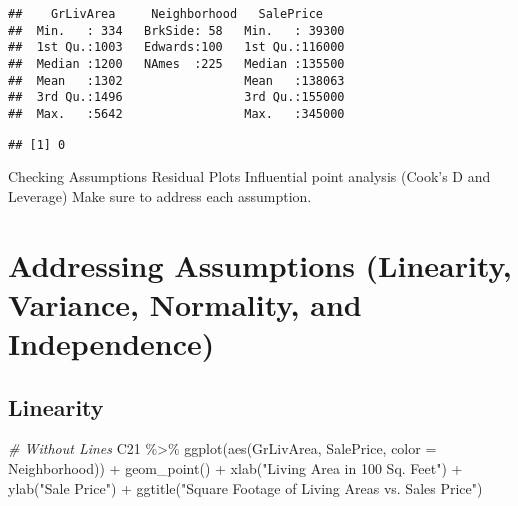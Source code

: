 \documentclass[
]{article}
\newenvironment{Shaded}{\begin{snugshade}}{\end{snugshade}}
\newcommand{\AttributeTok}[1]{\textcolor[rgb]{0.77,0.63,0.00}{#1}}
\newcommand{\CommentTok}[1]{\textcolor[rgb]{0.56,0.35,0.01}{\textit{#1}}}
\newcommand{\FunctionTok}[1]{\textcolor[rgb]{0.00,0.00,0.00}{#1}}
\newcommand{\NormalTok}[1]{#1}
\newcommand{\SpecialCharTok}[1]{\textcolor[rgb]{0.00,0.00,0.00}{#1}}
\newcommand{\StringTok}[1]{\textcolor[rgb]{0.31,0.60,0.02}{#1}}
\begin{document}
\begin{verbatim}
##    GrLivArea     Neighborhood   SalePrice     
##  Min.   : 334   BrkSide: 58   Min.   : 39300  
##  1st Qu.:1003   Edwards:100   1st Qu.:116000  
##  Median :1200   NAmes  :225   Median :135500  
##  Mean   :1302                 Mean   :138063  
##  3rd Qu.:1496                 3rd Qu.:155000  
##  Max.   :5642                 Max.   :345000
\end{verbatim}

\begin{Shaded}
\end{Shaded}

\begin{verbatim}
## [1] 0
\end{verbatim}

Checking Assumptions Residual Plots Influential point analysis (Cook's D
and Leverage) Make sure to address each assumption.

\hypertarget{addressing-assumptions-linearity-variance-normality-and-independence}{%
\section{Addressing Assumptions (Linearity, Variance, Normality, and
Independence)}\label{addressing-assumptions-linearity-variance-normality-and-independence}}

\hypertarget{linearity}{%
\subsection{Linearity}\label{linearity}}

\begin{Shaded}
\begin{Highlighting}[]
\CommentTok{\# Without Lines}
\NormalTok{C21 }\SpecialCharTok{\%\textgreater{}\%} \FunctionTok{ggplot}\NormalTok{(}\FunctionTok{aes}\NormalTok{(GrLivArea, SalePrice, }\AttributeTok{color =}\NormalTok{ Neighborhood)) }\SpecialCharTok{+} \FunctionTok{geom\_point}\NormalTok{() }\SpecialCharTok{+}
  \FunctionTok{xlab}\NormalTok{(}\StringTok{"Living Area in 100 Sq. Feet"}\NormalTok{) }\SpecialCharTok{+} \FunctionTok{ylab}\NormalTok{(}\StringTok{"Sale Price"}\NormalTok{) }\SpecialCharTok{+}
  \FunctionTok{ggtitle}\NormalTok{(}\StringTok{"Square Footage of Living Areas vs. Sales Price"}\NormalTok{)}
\end{Highlighting}
\end{Shaded}
\end{document}
